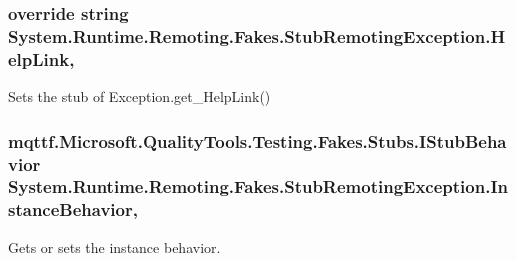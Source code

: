 \hypertarget{class_system_1_1_runtime_1_1_remoting_1_1_fakes_1_1_stub_remoting_exception_ada6313f80ccf795149569dd0faf8adb7}{
\subsubsection[{Help\-Link}]{\setlength{\rightskip}{0pt plus 5cm}override string System.\-Runtime.\-Remoting.\-Fakes.\-Stub\-Remoting\-Exception.\-Help\-Link\hspace{0.3cm}{\ttfamily [get]}, {\ttfamily [set]}}}\label{class_system_1_1_runtime_1_1_remoting_1_1_fakes_1_1_stub_remoting_exception_ada6313f80ccf795149569dd0faf8adb7}


Sets the stub of Exception.\-get\-\_\-\-Help\-Link()

\hypertarget{class_system_1_1_runtime_1_1_remoting_1_1_fakes_1_1_stub_remoting_exception_aa654a317903c8a3366db23a38df824d6}{
\subsubsection[{Instance\-Behavior}]{\setlength{\rightskip}{0pt plus 5cm}mqttf.\-Microsoft.\-Quality\-Tools.\-Testing.\-Fakes.\-Stubs.\-I\-Stub\-Behavior System.\-Runtime.\-Remoting.\-Fakes.\-Stub\-Remoting\-Exception.\-Instance\-Behavior\hspace{0.3cm}{\ttfamily [get]}, {\ttfamily [set]}}}\label{class_system_1_1_runtime_1_1_remoting_1_1_fakes_1_1_stub_remoting_exception_aa654a317903c8a3366db23a38df824d6}


Gets or sets the instance behavior.

